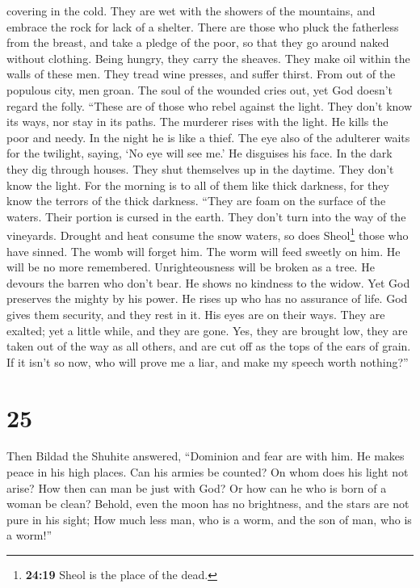 covering in the cold.  They are wet with the showers of
the mountains, and embrace the rock for lack of a shelter.
 There are those who pluck the fatherless from the breast,
and take a pledge of the poor,  so that they go around
naked without clothing. Being hungry, they carry the sheaves.
 They make oil within the walls of these men. They tread
wine presses, and suffer thirst.  From out of the
populous city, men groan. The soul of the wounded cries out, yet God
doesn't regard the folly.  ``These are of those who rebel
against the light. They don't know its ways, nor stay in its paths.
 The murderer rises with the light. He kills the poor and
needy. In the night he is like a thief.  The eye also of
the adulterer waits for the twilight, saying, `No eye will see me.' He
disguises his face.  In the dark they dig through houses.
They shut themselves up in the daytime. They don't know the light.
 For the morning is to all of them like thick darkness,
for they know the terrors of the thick darkness.  ``They
are foam on the surface of the waters. Their portion is cursed in the
earth. They don't turn into the way of the vineyards. 
Drought and heat consume the snow waters, so does Sheol\footnote{\textbf{24:19}
  Sheol is the place of the dead.} those who have sinned.
 The womb will forget him. The worm will feed sweetly on
him. He will be no more remembered. Unrighteousness will be broken as a
tree.  He devours the barren who don't bear. He shows no
kindness to the widow.  Yet God preserves the mighty by
his power. He rises up who has no assurance of life.  God
gives them security, and they rest in it. His eyes are on their ways.
 They are exalted; yet a little while, and they are gone.
Yes, they are brought low, they are taken out of the way as all others,
and are cut off as the tops of the ears of grain.  If it
isn't so now, who will prove me a liar, and make my speech worth
nothing?''

\hypertarget{section-18}{%
\section{25}\label{section-18}}

 Then Bildad the Shuhite answered, 
``Dominion and fear are with him. He makes peace in his high places.
 Can his armies be counted? On whom does his light not
arise?  How then can man be just with God? Or how can he
who is born of a woman be clean?  Behold, even the moon
has no brightness, and the stars are not pure in his sight;
 How much less man, who is a worm, and the son of man, who
is a worm!''

